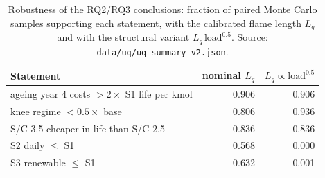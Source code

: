 \begin{table}[htbp]
\centering
\caption{Robustness of the RQ2/RQ3 conclusions: fraction of paired Monte Carlo samples supporting each statement, with the calibrated flame length $L_q$ and with the structural variant $L_q\,\mathrm{load}^{0.5}$. Source: \texttt{data/uq/uq\_summary\_v2.json}.}
\label{tab:robust}
\small
\begin{tabular}{lrr}
\toprule
Statement & nominal $L_q$ & $L_q \propto \mathrm{load}^{0.5}$ \\
\midrule
ageing year 4 costs $>2\times$ S1 life per kmol & 0.906 & 0.906 \\
knee regime $<0.5\times$ base & 0.806 & 0.936 \\
S/C 3.5 cheaper in life than S/C 2.5 & 0.836 & 0.836 \\
S2 daily $\le$ S1 & 0.568 & 0.000 \\
S3 renewable $\le$ S1 & 0.632 & 0.001 \\
\bottomrule
\end{tabular}
\end{table}
